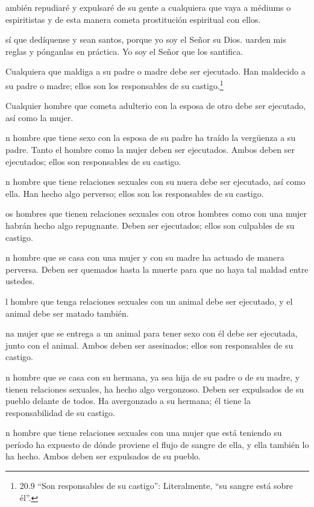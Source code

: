  ambién repudiaré y expulsaré de su gente a cualquiera que
vaya a médiums o espiritistas y de esta manera cometa prostitución
espiritual con ellos.

 sí que dedíquense y sean santos, porque yo soy el Señor su
Dios.  uarden mis reglas y pónganlas en práctica. Yo soy el
Señor que los santifica.

 Cualquiera que maldiga a su padre o madre debe ser
ejecutado. Han maldecido a su padre o madre; ellos son los responsables
de su castigo.\footnote{20.9 ``Son responsables de su castigo'':
  Literalmente, ``su sangre está sobre él''.}

 Cualquier hombre que cometa adulterio con la esposa de
otro debe ser ejecutado, así como la mujer.

 n hombre que tiene sexo con la esposa de su padre ha
traído la vergüenza a su padre. Tanto el hombre como la mujer deben ser
ejecutados. Ambos deben ser ejecutados; ellos son responsables de su
castigo.

 n hombre que tiene relaciones sexuales con su nuera debe
ser ejecutado, así como ella. Han hecho algo perverso; ellos son los
responsables de su castigo.

 os hombres que tienen relaciones sexuales con otros
hombres como con una mujer habrán hecho algo repugnante. Deben ser
ejecutados; ellos son culpables de su castigo.

 n hombre que se casa con una mujer y con su madre ha
actuado de manera perversa. Deben ser quemados hasta la muerte para que
no haya tal maldad entre ustedes.

 l hombre que tenga relaciones sexuales con un animal debe
ser ejecutado, y el animal debe ser matado también.

 na mujer que se entrega a un animal para tener sexo con él
debe ser ejecutada, junto con el animal. Ambos deben ser asesinados;
ellos son responsables de su castigo.

 n hombre que se casa con su hermana, ya sea hija de su
padre o de su madre, y tienen relaciones sexuales, ha hecho algo
vergonzoso. Deben ser expulsados de su pueblo delante de todos. Ha
avergonzado a su hermana; él tiene la responsabilidad de su castigo.

 n hombre que tiene relaciones sexuales con una mujer que
está teniendo su período ha expuesto de dónde proviene el flujo de
sangre de ella, y ella también lo ha hecho. Ambos deben ser expulsados
de su pueblo.

